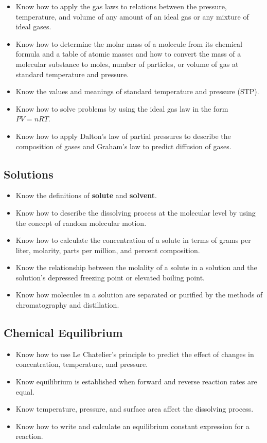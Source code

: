 \documentclass[11pt]{article}
\begin{document}
\begin{itemize}
\item Know how to apply the gas laws to relations between the pressure, temperature, and volume of any amount of an ideal gas or any mixture of ideal gases.
\item Know how to determine the molar mass of a molecule from its chemical formula and a table of atomic masses and how to convert the mass of a molecular substance to moles, number of particles, or volume of gas at standard temperature and pressure.
\item Know the values and meanings of standard temperature and pressure (STP).
\item Know how to solve problems by using the ideal gas law in the form \(PV = nRT\).
\item Know how to apply Dalton's law of partial pressures to describe the composition of gases and Graham's law to predict diffusion of gases.
\end{itemize}
\subsection{Solutions}
\label{sec:org681e9ee}

\begin{itemize}
\item Know the definitions of \textbf{solute} and \textbf{solvent}.
\item Know how to describe the dissolving process at the molecular level by using the concept of random molecular motion.
\item Know how to calculate the concentration of a solute in terms of grams per liter, molarity, parts per million, and percent composition.
\item Know the relationship between the molality of a solute in a solution and the solution's depressed freezing point or elevated boiling point.
\item Know how molecules in a solution are separated or purified by the methods of chromatography and distillation.
\end{itemize}
\subsection{Chemical Equilibrium}
\label{sec:orgaff273c}

\begin{itemize}
\item Know how to use Le Chatelier's principle to predict the effect of changes in concentration, temperature, and pressure.
\item Know equilibrium is established when forward and reverse reaction rates are equal.
\item Know temperature, pressure, and surface area affect the dissolving process.
\item Know how to write and calculate an equilibrium constant expression for a reaction.
\end{itemize}
\end{document}
